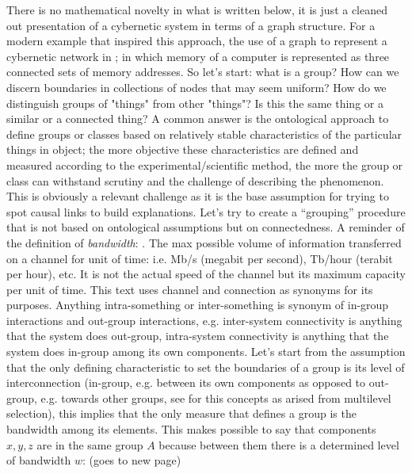 \documentclass[14pt]{extarticle}
\begin{document}
\newline
\hspace*{15mm}There is no mathematical novelty in what is written below, it is just a cleaned out presentation of a cybernetic system in terms of a graph structure. For a modern example that inspired this approach, the use of a graph to represent a cybernetic network in \cite{dijkstra1978fly}; in which memory of a computer is represented as three connected sets of memory addresses.
\newline
\hspace*{15mm}So let’s start: what  is a group? How can we discern boundaries in collections of nodes that may seem uniform? How do we distinguish groups of "things" from other "things"? Is this the same thing or a similar or a connected thing? A common answer is the ontological approach to define groups or classes based on relatively stable characteristics of the particular things in object; the more objective these characteristics are defined and measured according to the experimental/scientific method, the more the group or class can withstand scrutiny and the challenge of describing the phenomenon. This is obviously a relevant challenge as it is the base assumption for trying to spot causal links to build explanations. Let’s try to create a “grouping” procedure that is not based on ontological assumptions but on connectedness.
\newline
\hspace*{15mm}A reminder of the definition of \textit{bandwidth}:  \cite{WIKIbandwidth}. The max possible volume of information transferred on a channel for unit of time: i.e. Mb/s (megabit per second), Tb/hour (terabit per hour), etc. It is not the actual speed of the channel but its maximum capacity per unit of time.
\newline
This text uses channel and connection as synonyms for its purposes. Anything intra-something or inter-something is synonym of in-group interactions and out-group interactions, e.g. inter-system connectivity is anything that the system does out-group, intra-system connectivity is anything that the system does in-group among its own components. Let’s start from the assumption that the only defining characteristic to set the boundaries of a group is its level of interconnection (in-group, e.g. between its own components as opposed to out-group, e.g. towards other groups, see \cite{SLOANdarwin} for this concepts as arised from multilevel selection), this implies that the only measure that defines a group is the bandwidth among its elements. This makes possible to say that components \(x, y, z\)  are in the same group \(A\) because between them there is a determined level of bandwidth \(w\): (goes to new page)
\end{document}
